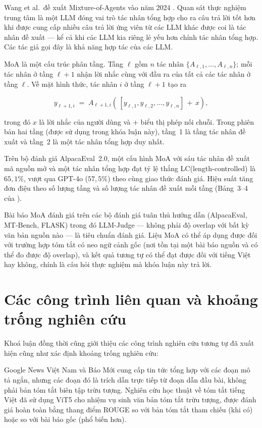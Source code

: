 Wang et al.\ đề xuất Mixture-of-Agents vào năm 2024 \cite{Wang2024}.
Quan sát thực nghiệm trung tâm là một LLM đóng vai trò tác
nhân tổng hợp cho ra câu trả lời tốt hơn khi được cung cấp nhiều
câu trả lời ứng viên từ các LLM khác được coi là tác nhân đề xuất
 --- kể cả khi các LLM kia riêng
lẻ yếu hơn chính tác nhân tổng hợp. Các tác giả gọi đây là
khả năng hợp tác của các LLM.

MoA là một cấu trúc phân tầng. Tầng $\ell$ gồm $n$ tác nhân
$\{A_{\ell,1}, \ldots, A_{\ell,n}\}$; mỗi tác nhân ở tầng $\ell+1$
nhận lời nhắc cùng với đầu ra của tất cả các tác nhân ở tầng $\ell$.
Về mặt hình thức, tác nhân $i$ ở tầng $\ell+1$ tạo ra

\[
y_{\ell+1,i} \;=\; A_{\ell+1,i}\!\left(\,[y_{\ell,1}, y_{\ell,2},
\ldots, y_{\ell,n}]\,+\,x\right),
\]

\noindent trong đó $x$ là lời nhắc của người dùng và $+$ biểu thị
phép nối chuỗi. Trong phiên bản hai tầng (được sử dụng trong khóa
luận này), tầng~1 là tầng tác nhân đề xuất và tầng~2 là một
tác nhân tổng hợp duy nhất.

Trên bộ đánh giá AlpacaEval~2.0, một cấu hình MoA với sáu tác nhân
đề xuất mã nguồn mở và một tác nhân tổng hợp đạt tỷ lệ thắng LC(length-controlled) là
$65,1\%$, vượt qua GPT-4o ($57,5\%$) theo cùng giao thức đánh giá.
Hiệu suất tăng đơn điệu theo số lượng tầng và số lượng tác nhân đề
xuất mỗi tầng (Bảng~3--4 của \cite{Wang2024}).

Bài báo MoA đánh giá trên các bộ đánh giá tuân thủ hướng dẫn
(AlpacaEval, MT-Bench, FLASK) trong đó LLM-Judge --- không phải
độ overlap với bất kỳ văn bản nguồn nào --- là tiêu chuẩn đánh giá.
Liệu MoA có thể áp dụng được đối với trường hợp tóm tắt có neo ngữ cảnh gốc
(nơi tồn tại một bài báo nguồn và có thể đo được độ overlap), và kết quả tương tự 
có thể đạt được đối với tiếng Việt hay không, chính là câu hỏi
thực nghiệm mà khóa luận này trả lời.

\section{Các công trình liên quan và khoảng trống nghiên cứu}
Khoá luận đồng thời cũng giới thiệu các công trình nghiên cứu tương tự đã xuất hiện cũng như xác định
khoảng trống nghiên cứu: 

Google News Việt Nam và Báo Mới cung cấp tin tức
tổng hợp với các đoạn mô tả ngắn, nhưng các đoạn đó là trích dẫn trực
tiếp từ đoạn dẫn đầu bài, không phải bản tóm tắt biên tập trừu tượng.
Nghiên cứu học thuật về tóm tắt tiếng Việt đã sử dụng ViT5
\cite{Nguyen2022} cho nhiệm vụ sinh văn bản tóm tắt trừu tượng, được đánh giá
hoàn toàn bằng thang điểm ROUGE so với bản tóm tắt tham chiếu (khi có)
hoặc so với bài báo gốc (phổ biến hơn).

